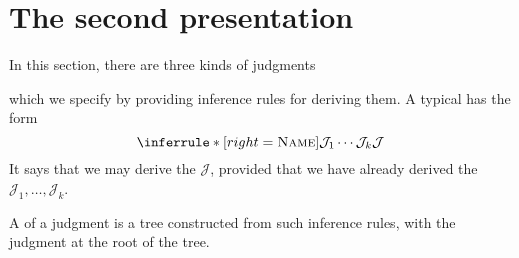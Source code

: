 \documentclass[hott-all.tex]{subfiles}
\begin{document}
\section{The second presentation}
%
In this section, there are three kinds of judgments
which we specify by providing inference rules for deriving them. A typical 
has the form
%
\begin{equation*}
  \inferrule*[right=\textsc{Name}]
  {\mathcal{J}_1 \\ \cdots \\ \mathcal{J}_k}
  {\mathcal{J}}
\end{equation*}
It says that we may derive the  $\mathcal{J}$, provided that we have
already derived the  $\mathcal{J}_1, \ldots, \mathcal{J}_k$.
%

A 
of a judgment is a tree constructed from such inference
rules, with the judgment at the root of the tree.
%
\end{document}
